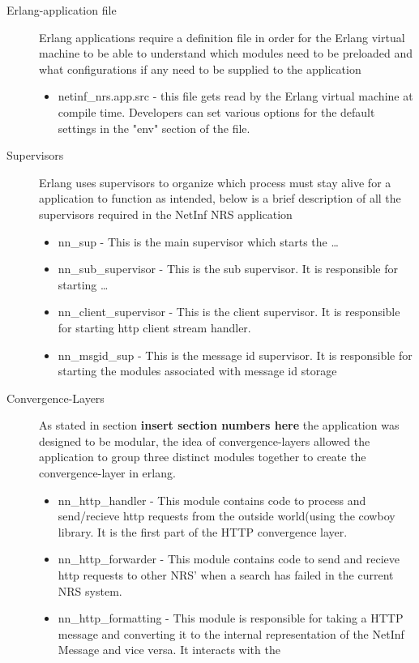 \begin{description}
\item[Erlang-application file]
Erlang applications require a definition file in order for the Erlang virtual machine to be able to understand which modules need to be preloaded and what configurations if any need to be supplied to the application
\begin{itemize}
\item netinf\_nrs.app.src - this file gets read by the Erlang virtual machine at compile time. Developers can set various options for the default settings in the "env" section of the file.
\end{itemize}
\item[Supervisors]
Erlang uses supervisors to organize which process must stay alive for a application to function as intended, below is a brief description of all the supervisors required in the NetInf NRS application
\begin{itemize}
\item nn\_sup - This is the main supervisor which starts the \ldots
\item nn\_sub\_supervisor - This is the sub supervisor. It is responsible for starting \ldots
\item nn\_client\_supervisor - This is the client supervisor. It is responsible for starting  http client stream handler. 
\item nn\_msgid\_sup - This is the message id supervisor. It is responsible for starting the modules associated with message id storage
\end{itemize}
\item[Convergence-Layers]
As stated in section \textbf{insert section numbers here} the application was designed to be modular, the idea of convergence-layers allowed the application to group three distinct modules together to create the convergence-layer in erlang.
\begin{itemize}
\item nn\_http\_handler - This module contains code to process and send/recieve http requests from the outside world(using the cowboy library. It is the first part of the HTTP convergence layer.
\item nn\_http\_forwarder - This module contains code to send and recieve http requests to other NRS' when a search has failed in the current NRS system.
\item nn\_http\_formatting - This module is responsible for taking a HTTP message and converting it to the internal representation of the NetInf Message and vice versa. It interacts with the 

\end{itemize}
\end{description}
